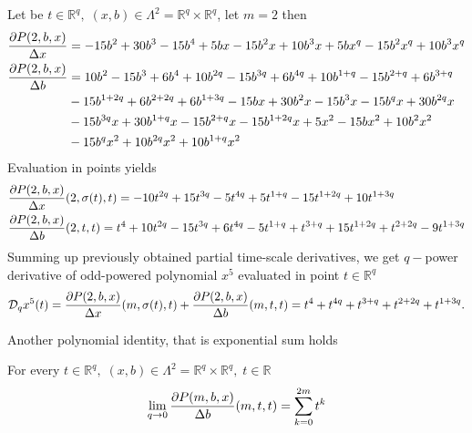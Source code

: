 \begin{examp}
    \label{time_scale_nq_example_2}
    Let be $t\in {\mathbb{R}}^{q}, \; (x,b) \in \Lambda^2 = {\mathbb{R}}^{q} \times {\mathbb{R}}^{q}$, let $m=2$ then
    \begin{align*}
        \frac{\partial P ( 2, b, x )}{\Delta x}
        &= -15 b^2 + 30 b^3 - 15 b^4 + 5 b x - 15 b^2 x + 10 b^3 x + 5 b x^q - 15 b^2 x^q + 10 b^3 x^q \\
        \frac{\partial P ( 2, b, x )}{\Delta b}
        &= 10 b^2 - 15 b^3 + 6 b^4 + 10 b^{2 q} - 15 b^{3 q} + 6 b^{4 q}
        + 10 b^{1 + q} - 15 b^{2 + q} + 6 b^{3 + q} \\
        &- 15 b^{1 + 2 q} + 6 b^{2 + 2 q} + 6 b^{1 + 3 q} - 15 b x + 30 b^2 x - 15 b^3 x
        - 15 b^q x + 30 b^{2 q} x \\
        &- 15 b^{3 q} x + 30 b^{1 + q} x - 15 b^{2 + q} x - 15 b^{1 + 2 q} x + 5 x^2 - 15 b x^2 + 10 b^2 x^2 \\
        &- 15 b^q x^2 + 10 b^{2 q} x^2 + 10 b^{1 + q} x^2
    \end{align*}
    Evaluation in points yields
    \begin{align*}
        &\frac{\partial P ( 2, b, x )}{\Delta x} (2, \sigma(t), t)
        = -10 t^{2 q} + 15 t^{3q} - 5 t^{4q} + 5 t^{1+q} - 15 t^{1+2q} + 10 t^{1 + 3 q} \\
        &\frac{\partial P ( 2, b, x )}{\Delta b} (2, t, t)
        = t^4 + 10 t^{2 q} - 15 t^{3 q} + 6 t^{4 q} - 5 t^{1 + q} + t^{3 + q}
        + 15 t^{1 + 2 q} + t^{2 + 2 q} - 9 t^{1 + 3 q}
    \end{align*}
    Summing up previously obtained partial time-scale derivatives, we get $q-$power derivative of odd-powered polynomial
    $x^5$ evaluated in point $t\in {\mathbb{R}}^{q}$
    \begin{align*}
        \mathcal{D}_q x^{5}(t)
        = \frac{\partial P ( 2, b, x )}{\Delta x} (m, \sigma(t), t)
        + \frac{\partial P ( 2, b, x )}{\Delta b} (m, t, t)
        = t^4 + t^{4 q} + t^{3 + q} + t^{2 + 2 q} + t^{1 + 3 q}.
    \end{align*}
\end{examp}
Another polynomial identity, that is exponential sum holds
\begin{cor}
    \label{time_scale_nq_corollary_1}
    For every $t\in {\mathbb{R}}^{q}, \; (x,b) \in \Lambda^2 = {\mathbb{R}}^{q} \times {\mathbb{R}}^{q}, \; t\in\mathbb{R}$
    \begin{align*}
        \lim \limits_{q \to 0} \frac{\partial P ( m, b, x )}{\Delta b} (m, t, t)
        = \sum_{k=0}^{2m} t^k
    \end{align*}
\end{cor}
